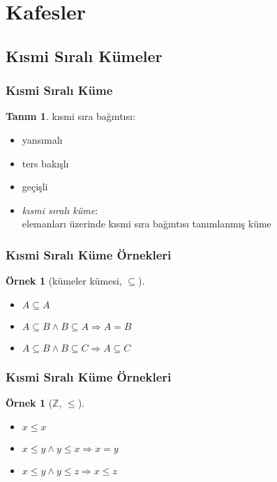 \documentclass[dvipsnames]{beamer}
\theoremstyle{definition}
\newtheorem{tanim}[theorem]{Tanım}
\theoremstyle{example}
\newtheorem{ornek}[theorem]{Örnek}
\theoremstyle{plain}
\begin{document}
\section{Kafesler}

\subsection{Kısmi Sıralı Kümeler}

\begin{frame}
  \frametitle{Kısmi Sıralı Küme}

  \begin{tanim}
    \alert{kısmi sıra bağıntısı}:
    \begin{itemize}
      \item yansımalı
      \item ters bakışlı
      \item geçişli
    \end{itemize}
  \end{tanim}

  \pause
  \begin{itemize}
    \item \emph{kısmi sıralı küme}:\\
      elemanları üzerinde kısmi sıra bağıntısı tanımlanmış küme
  \end{itemize}
\end{frame}

\begin{frame}
  \frametitle{Kısmi Sıralı Küme Örnekleri}

  \begin{ornek}[kümeler kümesi, $\subseteq$]
    \begin{itemize}
      \item $A \subseteq A$
      \item $A \subseteq B \wedge B \subseteq A \Rightarrow A = B$
      \item $A \subseteq B \wedge B \subseteq C \Rightarrow A \subseteq C$
    \end{itemize}
  \end{ornek}
\end{frame}

\begin{frame}
  \frametitle{Kısmi Sıralı Küme Örnekleri}

  \begin{ornek}[$\mathbb{Z}$, $\leq$]
    \begin{itemize}
      \item $x \leq x$
      \item $x \leq y \wedge y \leq x \Rightarrow x = y$
      \item $x \leq y \wedge y \leq z \Rightarrow x \leq z$
    \end{itemize}
  \end{ornek}
\end{frame}
\end{document}
